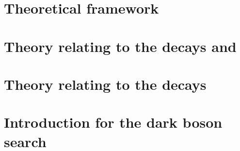 \chapter{Theoretical framework}
\label{ch:theory}






\chapter[Introduction for the decays \btokpipimumu and \btophikmumu]
{Theory relating to the decays \tmath{\btokpipimumu} and \tmath{\btophikmumu}}


\chapter[Introduction for the decay \btodsphi]
{Theory relating to the decays \tmath{\btodsphi}}


\chapter{Introduction for the dark boson search}

